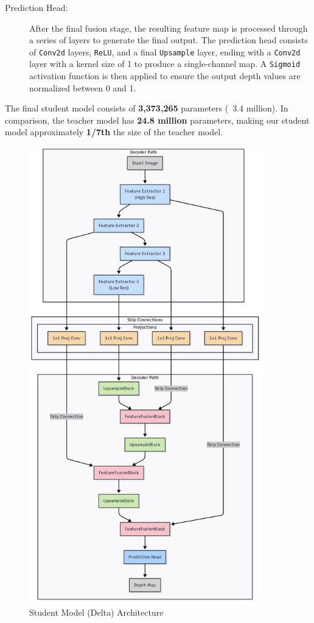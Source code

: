 \begin{enumerate}
\begin{description}
        \item[Prediction Head:] After the final fusion stage, the resulting feature map is processed through a series of layers to generate the final output. The prediction head consists of \texttt{Conv2d} layers, \texttt{ReLU}, and a final \texttt{Upsample} layer, ending with a \texttt{Conv2d} layer with a kernel size of 1 to produce a single-channel map. A \texttt{Sigmoid} activation function is then applied to ensure the output depth values are normalized between 0 and 1.
    \end{description}
\end{enumerate}

The final student model consists of \textbf{3,373,265} parameters (~3.4 million). In comparison, the teacher model has \textbf{24.8 million} parameters, making our student model approximately \textbf{1/7th} the size of the teacher model.


\begin{figure}[htbp!]
    \centering
    \includegraphics[width=0.9\textwidth, height=0.9\textheight]{images/delta_arch.png}
    \caption{Student Model (Delta) Architecture}
    \label{fig:delta_arch}
\end{figure}